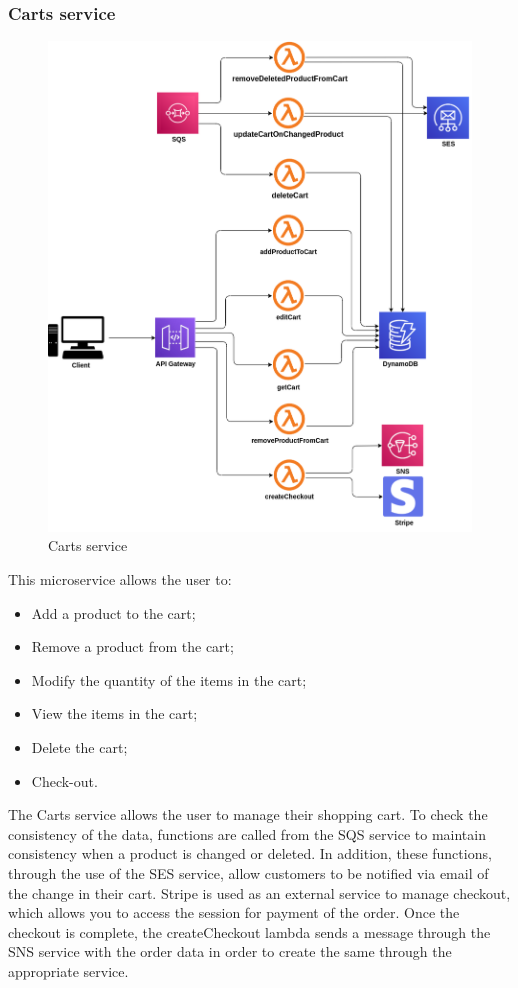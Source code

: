 \subsubsection{Carts service}
\begin{figure}[!h]
    \vspace{5px}
    \includegraphics[scale=0.5]{../../../../Images/Diagrammi/maintainerManual/cartService.png}
    \centering
    \caption{Carts service}
\end{figure}
This microservice allows the user to:
\begin{itemize}
    \item Add a product to the cart;
    \item Remove a product from the cart;
    \item Modify the quantity of the items in the cart;
    \item View the items in the cart;
    \item Delete the cart;
    \item Check-out.
\end{itemize}
The Carts service allows the user to manage their shopping cart.
To check the consistency of the data, functions are called from the SQS service to maintain consistency when a product is changed or deleted.
In addition, these functions, through the use of the SES service, allow customers to be notified via email of the change in their cart.
Stripe is used as an external service to manage checkout, which allows you to access the session for payment of the order. Once the checkout is complete, the createCheckout lambda sends a message through the SNS service with the order data in order to create the same through the appropriate service.
\pagebreak
